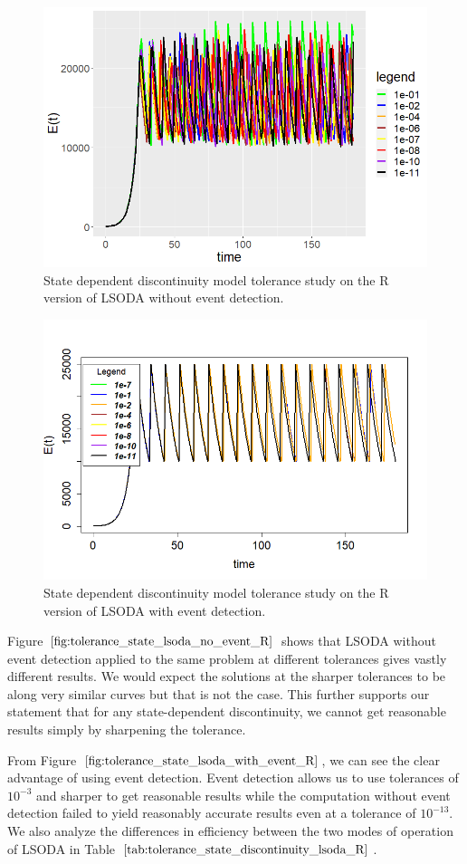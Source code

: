 \begin{figure}[h]
\centering
\includegraphics[width=0.7\linewidth]{./figures/tolerance_state_lsoda_no_event_R}
\caption{State dependent discontinuity model tolerance study on the R version of LSODA without event detection.}
\label{fig:tolerance_state_lsoda_no_event_R}
\end{figure}

\begin{figure}[h]
\centering
\includegraphics[width=0.7\linewidth]{./figures/tolerance_state_lsoda_with_event_R}
\caption{State dependent discontinuity model tolerance study on the R version of LSODA with event detection.}
\label{fig:tolerance_state_lsoda_with_event_R}
\end{figure}

Figure $\ref{fig:tolerance_state_lsoda_no_event_R}$ shows that LSODA without event detection applied to the same problem at different tolerances gives vastly different results. We would expect the solutions at the sharper tolerances to be along very similar curves but that is not the case. This further supports our statement that for any state-dependent discontinuity, we cannot get reasonable results simply by sharpening the tolerance.

From Figure $\ref{fig:tolerance_state_lsoda_with_event_R}$, we can see the clear advantage of using event detection. Event detection allows us to use tolerances of $10^{-3}$ and sharper to get reasonable results while the computation without event detection failed to yield reasonably accurate results even at a tolerance of $10^{-13}$. We also analyze the differences in efficiency between the two modes of operation of LSODA in Table $\ref{tab:tolerance_state_discontinuity_lsoda_R}$.

